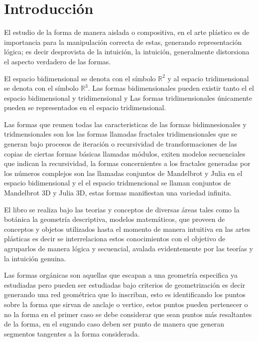 \documentclass[
  16pt,
]{krantz}
\theoremstyle{definition}
\theoremstyle{definition}
\theoremstyle{definition}
\theoremstyle{definition}
\theoremstyle{remark}
\begin{document}
\hypertarget{introducciuxf3n}{%
\chapter*{Introducción}\label{introducciuxf3n}}


El estudio de la forma de manera aislada o compositiva, en el arte plástico es de importancia para la manipulación correcta de estas, generando representación lógica; es decir desprovista de la intuición, la intuición, generalmente distorsiona el aspecto verdadero de las formas.

El espacio bidimensional se denota con el símbolo \(\mathbb{R}^2\) y al espacio tridimensional se denota con el símbolo \(\mathbb{R}^3\). Las formas bidimensionales pueden existir tanto el el espacio bidimensional y tridimensional y Las formas tridimensionales únicamente pueden se representados en el espacio tridimensional.

Las formas que reunen todas las caracteristicas de las formas bidimnesionales y tridmensionales son los las formas llamadas fractales tridimensionales que se generan bajo procesos de iteración o recursividad de transformaciones de las copias de ciertas formas básicas llamadas módulos, exiten modelos secuenciales que indican la recursividad, la formas concernientes a los fractales generadas por los números complejos son las llamadas conjuntos de Mandelbrot y Julia en el espacio bidimensional y el el espacio tridmencional se llaman conjuntos de Mandelbrot 3D y Julia 3D, estas formas manifiestan una variedad infinita.

El libro se realiza bajo las teorias y conceptos de diversas áreas tales como la botánica la geometría descriptiva, modelos matemáticos, que proveen de conceptos y objetos utilizados hasta el momento de manera intuitiva en las artes plásticas es decir se interrelaciona estos conocimientos con el objetivo de agruparlos de manera lógica y secuencial, avalada evidentemente por las teorías y la intuición genuina.

Las formas orgánicas son aquellas que escapan a una geometría especifica ya estudiadas pero pueden ser estudiadas bajo criterios de geometrización es decir generando una red geométrica que lo inscriban, esto es identificando los puntos sobre la forma que sirvan de anclaje o vertice, estos puntos pueden pertenecer o no la forma en el primer caso se debe considerar que sean puntos más resaltantes de la forma, en el sugundo caso deben ser punto de manera que generan segmentos tangentes a la forma considerada.
\end{document}
